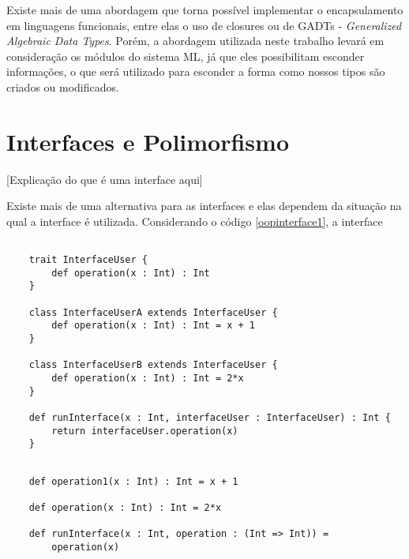 Existe mais de uma abordagem que torna 
possível implementar o encapsulamento em 
linguagens funcionais, entre elas o uso 
de closures\cite{classlessjs} ou de 
GADTs - \textit{Generalized Algebraic 
Data Types}\cite{existentialhaskell}. 
Porém, a abordagem utilizada neste 
trabalho levará em consideração os 
módulos do sistema ML, já que eles 
possibilitam esconder informações, 
o que será utilizado para esconder a 
forma como nossos tipos são criados 
ou modificados\cite{mlmodules}.


\section{Interfaces e Polimorfismo}

[Explicação do que é uma interface aqui]

Existe mais de uma alternativa para as interfaces 
e elas dependem da situação na qual a interface é 
utilizada. Considerando o código \ref{oopinterface1}, 
a interface 


\begin{lstlisting}[caption={Interfaces em Orientação a Objetos},label=oopinterface1]
    
    trait InterfaceUser {
        def operation(x : Int) : Int
    }

    class InterfaceUserA extends InterfaceUser {
        def operation(x : Int) : Int = x + 1
    }

    class InterfaceUserB extends InterfaceUser {
        def operation(x : Int) : Int = 2*x
    }

    def runInterface(x : Int, interfaceUser : InterfaceUser) : Int {
        return interfaceUser.operation(x)
    }

\end{lstlisting}


\begin{lstlisting}[caption={Interfaces em Programação Funcional},label=fpinterface1]
    
    def operation1(x : Int) : Int = x + 1

    def operation(x : Int) : Int = 2*x

    def runInterface(x : Int, operation : (Int => Int)) =
        operation(x)
    

\end{lstlisting}







